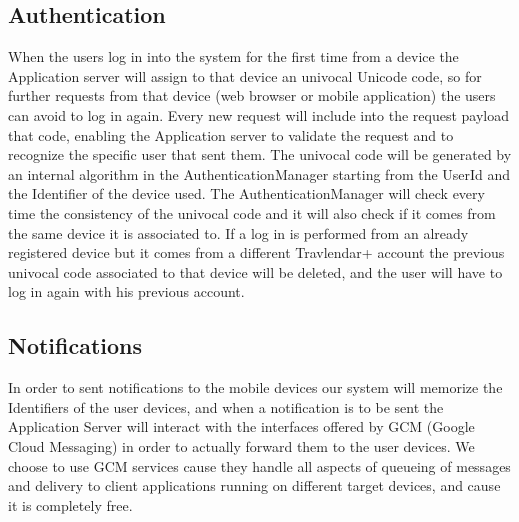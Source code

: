 \subsection{Authentication}
When the users log in into the system for the first time from a device the Application server will assign to that device an univocal Unicode code, so for further requests from that device (web browser or mobile application) the users can avoid to log in again. Every new request will include into the request payload that code, enabling the Application server to validate the request and to recognize the specific user that sent them. The univocal code will be generated by an internal algorithm in the AuthenticationManager starting from the UserId and the Identifier of the device used. The AuthenticationManager will check every time the consistency of the univocal code and it will also check if it comes from the same device it is associated to.
If a log in is performed from an already registered device but it comes from a different Travlendar+ account the previous univocal code associated to that device will be deleted, and the user will have to log in again with his previous account.

\subsection{Notifications}
In order to sent notifications to the mobile devices our system will memorize the Identifiers of the user devices, and when a notification is to be sent the Application Server will interact with the interfaces offered by GCM (Google Cloud Messaging) in order to actually forward them to the user devices. We choose to use GCM services cause they handle all aspects of queueing of messages and delivery to client applications running on different target devices, and cause it is completely free.

